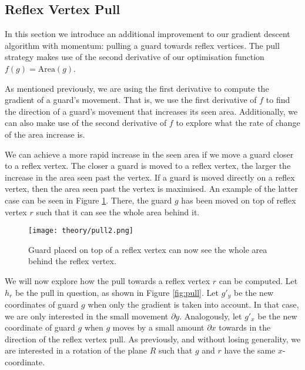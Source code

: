 \subsection{Reflex Vertex Pull}

In this section we introduce an additional improvement to our gradient descent algorithm with momentum: pulling a guard towards reflex vertices. The pull strategy makes use of the second derivative of our optimisation function $f(g) = \text{Area}(g)$.



As mentioned previously, we are using the first derivative to compute the gradient of a guard's movement. That is, we use the first derivative of $f$ to find the direction of a guard's movement that increases its seen area. Additionally, we can also make use of the second derivative of $f$ to explore what the rate of change of the area increase is. 

We can achieve a more rapid increase in the seen area if we move a guard closer to a reflex vertex. The closer a guard is moved to a reflex vertex, the larger the increase in the area seen past the vertex. If a guard is moved directly on a reflex vertex, then the area seen past the vertex is maximised. An example of the latter case can be seen in Figure \ref{fig:top_reflex_vertex}. There, the guard $g$ has been moved on top of reflex vertex $r$ such that it can see the whole area behind it.

\begin{figure}[h!]
    \centering
    \texttt{[image: theory/pull2.png]}
    \caption{Guard placed on top of a reflex vertex can now see the whole area behind the reflex vertex.}
    \label{fig:top_reflex_vertex}
\end{figure}

We will now explore how the pull towards a reflex vertex $r$ can be computed. Let $h_r$ be the pull in question, as shown in Figure \ref{fig:pull}. Let $g'_y$ be the new coordinates of guard $g$ when only the gradient is taken into account. In that case, we are only interested in the small movement $\partial y$. Analogously, let $g'_x$ be the new coordinate of guard $g$ when $g$ moves by a small amount $\partial x$ towards in the direction of the reflex vertex pull. As previously, and without losing generality, we are interested in a rotation of the plane $R$ such that $g$ and $r$ have the same $x$-coordinate. 

